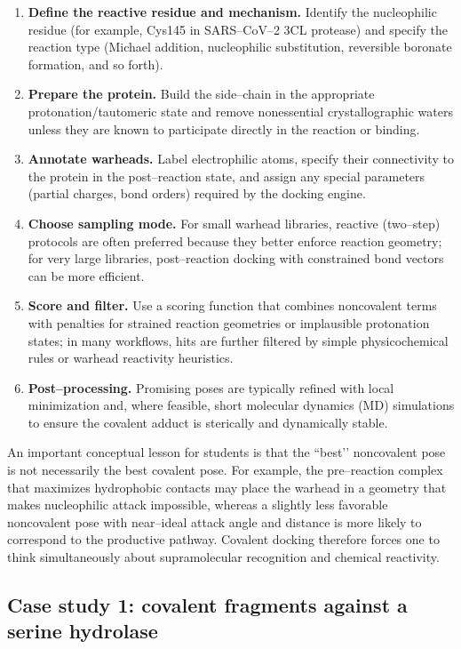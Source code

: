\documentclass[12pt]{article}
\begin{document}
\begin{enumerate}
  \item \textbf{Define the reactive residue and mechanism.} Identify the nucleophilic residue (for example, Cys145 in SARS–CoV–2 3CL protease) and specify the reaction type (Michael addition, nucleophilic substitution, reversible boronate formation, and so forth).  
  \item \textbf{Prepare the protein.} Build the side–chain in the appropriate protonation/tautomeric state and remove nonessential crystallographic waters unless they are known to participate directly in the reaction or binding.  
  \item \textbf{Annotate warheads.} Label electrophilic atoms, specify their connectivity to the protein in the post–reaction state, and assign any special parameters (partial charges, bond orders) required by the docking engine.  
  \item \textbf{Choose sampling mode.} For small warhead libraries, reactive (two–step) protocols are often preferred because they better enforce reaction geometry; for very large libraries, post–reaction docking with constrained bond vectors can be more efficient.  
  \item \textbf{Score and filter.} Use a scoring function that combines noncovalent terms with penalties for strained reaction geometries or implausible protonation states; in many workflows, hits are further filtered by simple physicochemical rules or warhead reactivity heuristics.  
  \item \textbf{Post–processing.} Promising poses are typically refined with local minimization and, where feasible, short molecular dynamics (MD) simulations to ensure the covalent adduct is sterically and dynamically stable.
\end{enumerate}

An important conceptual lesson for students is that the “best’’ noncovalent pose is not necessarily the best covalent pose.  
For example, the pre–reaction complex that maximizes hydrophobic contacts may place the warhead in a geometry that makes nucleophilic attack impossible, whereas a slightly less favorable noncovalent pose with near–ideal attack angle and distance is more likely to correspond to the productive pathway.  
Covalent docking therefore forces one to think simultaneously about supramolecular recognition and chemical reactivity.

\subsection{Case study 1: covalent fragments against a serine hydrolase}
\end{document}
